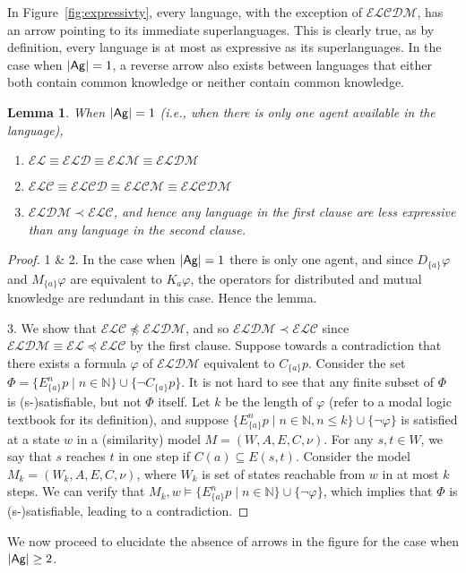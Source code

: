 \documentclass{article}
\newtheorem{lemma}[theorem]{Lemma}%
\newcommand{\ab}{\ensuremath{A}\xspace}
\newcommand{\ag}{\text{\normalfont\textsf{Ag}}\xspace}
\renewcommand{\phi}{\varphi}
\newcommand{\mbN}{\mathbb{N}}
\newcommand{\lang}{\ensuremath{\mathcal{EL}}\xspace}
\newcommand{\langc}{\ensuremath{\mathcal{ELC}}\xspace}
\newcommand{\langd}{\ensuremath{\mathcal{ELD}}\xspace}
\newcommand{\langm}{\ensuremath{\mathcal{ELM}}\xspace}
\newcommand{\langcd}{\ensuremath{\mathcal{ELCD}}\xspace}
\newcommand{\langcm}{\ensuremath{\mathcal{ELCM}}\xspace}
\newcommand{\langdm}{\ensuremath{\mathcal{ELDM}}\xspace}
\newcommand{\langcdm}{\ensuremath{\mathcal{ELCDM}}\xspace}
\begin{document}
In Figure~\ref{fig:expressivty}, every language, with the exception of \langcdm, has an arrow pointing to its immediate superlanguages. This is clearly true, as by definition, every language is at most as expressive as its superlanguages. In the case when $|\ag|=1$, a reverse arrow also exists between languages that either both contain common knowledge or neither contain common knowledge.

\begin{lemma}\label{lem:exp1}
When $|\ag|= 1$ (i.e., when there is only one agent available in the language), 
\begin{enumerate}
\item $\lang\equiv\langd\equiv\langm\equiv\langdm$
\item $\langc\equiv\langcd\equiv\langcm\equiv\langcdm$
\item\label{it:exp-c} $\langdm \prec \langc$, and hence any language in the first clause are less expressive than any language in the second clause.
\end{enumerate}
\end{lemma}
\begin{proof}
1 \& 2. In the case when $|\ag|=1$ there is only one agent, and since $D_{\{a\}} \phi$ and $M_{\{a\}} \phi$ are equivalent to $K_a \phi$, the operators for distributed and mutual knowledge are redundant in this case. Hence the lemma.

3. We show that $\langc \not\preceq \langdm$, and so $\langdm \prec \langc$ since $\langdm\equiv\lang \preceq \langc$ by the first clause. Suppose towards a contradiction that there exists a formula $\phi$ of $\langdm$ equivalent to $C_{\{a\}}p$. Consider the set $\Phi=\{E_{\{a\}}^n p\mid n\in\mbN\}\cup\{\neg C_{\{a\}}p\}$. It is not hard to see that any finite subset of $\Phi$ is (s-)satisfiable, but not $\Phi$ itself. 
Let $k$ be the length of $\phi$ (refer to a modal logic textbook for its definition), and suppose $\{E_{\{a\}}^n p\mid n\in\mbN, n\leq k\}\cup\{\neg\phi\}$ is satisfied at a state $w$ in a (similarity) model $M=(W,\ab,E,C,\nu)$. For any $s,t \in W$, we say that $s$ reaches $t$ in one step if $C(a)\subseteq E(s,t)$. Consider the model $M_k=(W_k,\ab,E,C,\nu)$, where $W_k$ is set of states reachable from $w$ in at most $k$ steps. We can verify that $M_k, w \models \{E_{\{a\}}^n p\mid n\in\mbN\}\cup\{\neg\phi\}$, which implies that $\Phi$ is (s-)satisfiable, leading to a contradiction.
\end{proof}

We now proceed to elucidate the absence of arrows in the figure for the case when $|\ag| \geq 2$.
\end{document}
